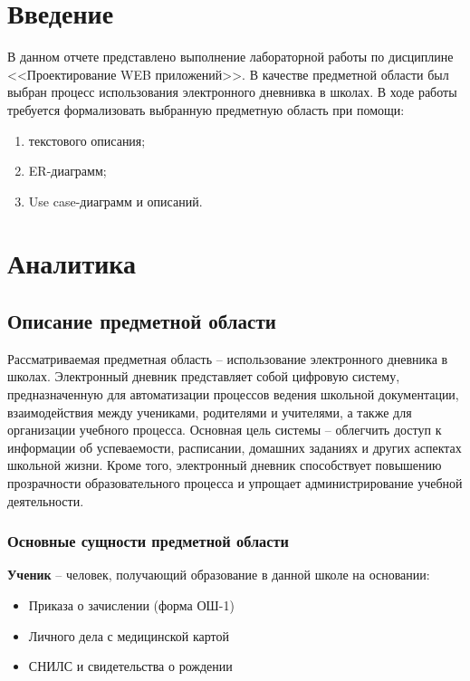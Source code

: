 \documentclass[a4paper, final]{article}
\begin{document}
\newpage

\tableofcontents

\newpage

\cleardoublepage
{}

\section*{Введение}
В данном отчете представлено выполнение лабораторной работы по дисциплине <<Проектирование WEB приложений>>. В качестве предметной области был выбран процесс использования электронного дневнивка в школах.
В ходе работы требуется формализовать выбранную предметную область при помощи:
\begin{enumerate}
    \item текстового описания;
    \item ER-диаграмм;
    \item Use case-диаграмм и описаний.
\end{enumerate}

\newpage
\section{Аналитика}
\subsection{Описание предметной области}

Рассматриваемая предметная область -- использование электронного дневника в школах. Электронный дневник представляет собой цифровую систему, предназначенную для автоматизации процессов ведения школьной документации, взаимодействия между учениками, родителями и учителями, а также для организации учебного процесса. Основная цель системы -- облегчить доступ к информации об успеваемости, расписании, домашних заданиях и других аспектах школьной жизни. Кроме того, электронный дневник способствует повышению прозрачности образовательного процесса и упрощает администрирование учебной деятельности.

\subsubsection{Основные сущности предметной области}

\textbf{Ученик} -- человек, получающий образование в данной школе на основании: 
\begin{itemize}
  \item Приказа о зачислении (форма ОШ-1)
  \item Личного дела с медицинской картой
  \item СНИЛС и свидетельства о рождении
\end{itemize}
\end{document}
